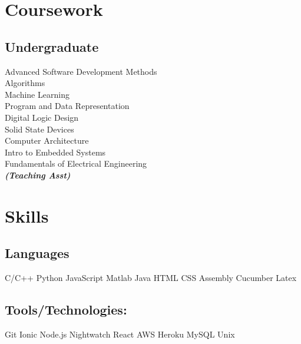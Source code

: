 \documentclass[]{deedy-resume-openfont}
\begin{document}
\begin{minipage}[t]{0.33\textwidth}
\section{Coursework}
\subsection{Undergraduate}
Advanced Software Development Methods \\
Algorithms \\
Machine Learning \\
Program and Data Representation \\
Digital Logic Design \\
Solid State Devices \\
Computer Architecture \\
Intro to Embedded Systems \\
Fundamentals of Electrical Engineering \\
{\footnotesize \textit{\textbf{(Teaching Asst) }}} \\
\sectionsep


\section{Skills}
\subsection{Languages}
C/C++ \textbullet{}  Python  \textbullet{} JavaScript \textbullet{} Matlab   \textbullet{} Java   \textbullet{} HTML   \textbullet{} CSS   \textbullet{} Assembly \textbullet{} Cucumber \textbullet{}  Latex \\
\sectionsep
\subsection{Tools/Technologies:}
Git \textbullet{} Ionic \textbullet{} Node.js \textbullet{} Nightwatch \textbullet{} React \textbullet{} AWS \textbullet{} Heroku  \textbullet{} MySQL   \textbullet{} Unix \\
\sectionsep

%
%

\end{minipage} 
\hfill
\end{document}
